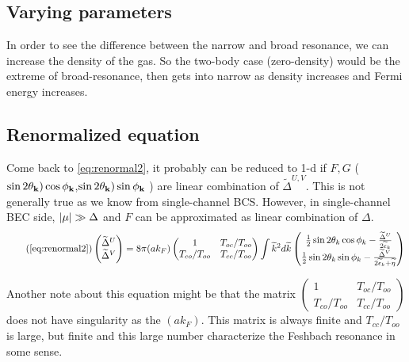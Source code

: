 \subsection{Varying parameters}
In order to see the difference between the narrow and broad resonance,  we can increase the density of the gas.  So the two-body case (zero-density) would be the extreme of broad-resonance, then gets into narrow as density increases and Fermi energy increases.  

\subsection{Renormalized equation}
Come back to \ref{eq:renormal2}, it probably can be reduced to 1-d if $F,G$ ($\sin2\theta_{\mathbf{k}})\cos\phi_{\mathbf{k}}$,$\sin2\theta_{\mathbf{k}})\sin\phi_{\mathbf{k}}$ ) are linear combination of $\widetilde\Delta^{U,V}$.  This is not generally true as we know from single-channel BCS.  However,   in single-channel BEC side,   $\lvert{\mu}\rvert\gg\Delta$ and $F$ can be approximated as linear combination of $\Delta$.  
\begin{equation}\tag{\ref{eq:renormal2}}
\begin{pmatrix}\widetilde\Delta^U\\\widetilde\Delta^V\end{pmatrix}=
8\pi({a}{k_F})\begin{pmatrix}1&T_{oc}/T_{oo}\\T_{co}/T_{oo}&T_{cc}/T_{oo}\end{pmatrix}
\int\widetilde{k}^2d\widetilde{k}
\begin{pmatrix}
\nth{2}\sin2\theta_{k}\cos\phi_k-\frac{\widetilde\Delta^U}{2\widetilde\epsilon_k}\\
\nth{2}\sin2\theta_{k}\sin\phi_k-\frac{\widetilde\Delta^V}{2\widetilde\epsilon_k+\widetilde{\eta}}
\end{pmatrix}
\end{equation}

Another note about this equation might be that the matrix $\begin{pmatrix}1&T_{oc}/T_{oo}\\T_{co}/T_{oo}&T_{cc}/T_{oo}\end{pmatrix}$ does not have singularity as the $(ak_{F})$.  This matrix is always finite and $T_{cc}/T_{oo}$ is large, but finite and this large number characterize the Feshbach resonance in some sense.  
